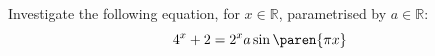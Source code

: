 Investigate the following equation, for $x \in \mathbb{R}$,
parametrised by $a \in \mathbb{R}$:
\begin{equation*}
  4^x + 2 = 2^x a \sin\paren{\pi x}
\end{equation*}
